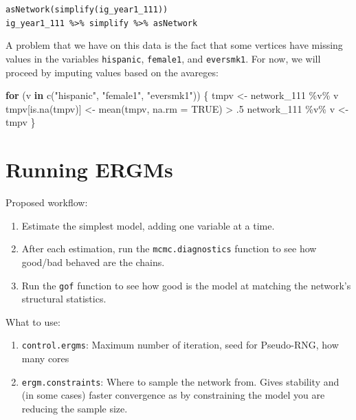 \documentclass[
]{book}
\newenvironment{Shaded}{\begin{snugshade}}{\end{snugshade}}
\newcommand{\AttributeTok}[1]{\textcolor[rgb]{0.77,0.63,0.00}{#1}}
\newcommand{\ConstantTok}[1]{\textcolor[rgb]{0.00,0.00,0.00}{#1}}
\newcommand{\ControlFlowTok}[1]{\textcolor[rgb]{0.13,0.29,0.53}{\textbf{#1}}}
\newcommand{\DecValTok}[1]{\textcolor[rgb]{0.00,0.00,0.81}{#1}}
\newcommand{\FunctionTok}[1]{\textcolor[rgb]{0.00,0.00,0.00}{#1}}
\newcommand{\NormalTok}[1]{#1}
\newcommand{\OtherTok}[1]{\textcolor[rgb]{0.56,0.35,0.01}{#1}}
\newcommand{\SpecialCharTok}[1]{\textcolor[rgb]{0.00,0.00,0.00}{#1}}
\newcommand{\StringTok}[1]{\textcolor[rgb]{0.31,0.60,0.02}{#1}}
\begin{document}
\texttt{asNetwork(simplify(ig\_year1\_111))}
\texttt{ig\_year1\_111\ \%\textgreater{}\%\ simplify\ \%\textgreater{}\%\ asNetwork}

A problem that we have on this data is the fact that some vertices have
missing values in the variables \texttt{hispanic}, \texttt{female1}, and \texttt{eversmk1}. For now,
we will proceed by imputing values based on the avareges:

\begin{Shaded}
\begin{Highlighting}[]
\ControlFlowTok{for}\NormalTok{ (v }\ControlFlowTok{in} \FunctionTok{c}\NormalTok{(}\StringTok{"hispanic"}\NormalTok{, }\StringTok{"female1"}\NormalTok{, }\StringTok{"eversmk1"}\NormalTok{)) \{}
\NormalTok{  tmpv }\OtherTok{\textless{}{-}}\NormalTok{ network\_111 }\SpecialCharTok{\%v\%}\NormalTok{ v}
\NormalTok{  tmpv[}\FunctionTok{is.na}\NormalTok{(tmpv)] }\OtherTok{\textless{}{-}} \FunctionTok{mean}\NormalTok{(tmpv, }\AttributeTok{na.rm =} \ConstantTok{TRUE}\NormalTok{) }\SpecialCharTok{\textgreater{}}\NormalTok{ .}\DecValTok{5}
\NormalTok{  network\_111 }\SpecialCharTok{\%v\%}\NormalTok{ v }\OtherTok{\textless{}{-}}\NormalTok{ tmpv}
\NormalTok{\}}
\end{Highlighting}
\end{Shaded}

\hypertarget{running-ergms}{%
\section{Running ERGMs}\label{running-ergms}}

Proposed workflow:

\begin{enumerate}
\def\labelenumi{\arabic{enumi}.}
\item
  Estimate the simplest model, adding one variable at a time.
\item
  After each estimation, run the \texttt{mcmc.diagnostics} function to see how good/bad behaved are the chains.
\item
  Run the \texttt{gof} function to see how good is the model at matching the network's structural statistics.
\end{enumerate}

What to use:

\begin{enumerate}
\def\labelenumi{\arabic{enumi}.}
\item
  \texttt{control.ergms}: Maximum number of iteration, seed for Pseudo-RNG, how many cores
\item
  \texttt{ergm.constraints}: Where to sample the network from. Gives stability and (in some cases) faster convergence as by constraining the model you are reducing the sample size.
\end{enumerate}
\end{document}
